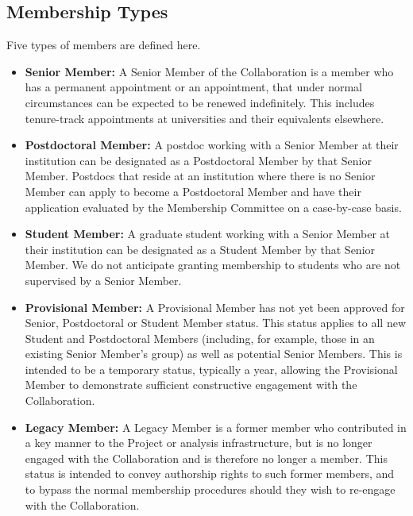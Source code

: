 \documentclass[12pt]{article}
\begin{document}
\subsection{Membership Types}
\label{sec:memtypes}
Five types of members are defined here.  
\begin{itemize}

\item {\bf Senior Member:} A Senior Member of the Collaboration is a member who has a permanent appointment or an appointment, that under normal circumstances can be expected to be renewed indefinitely.   This includes tenure-track appointments at universities and their equivalents elsewhere.  

\item {\bf Postdoctoral Member:} A postdoc working with a Senior Member at their institution can be designated as a Postdoctoral Member by that Senior Member.  Postdocs that reside at an institution where there is no Senior Member can apply to become a Postdoctoral Member and have their application evaluated by the Membership Committee on a case-by-case basis. 

\item {\bf Student Member:} A graduate student working with a Senior Member at their institution can be designated as a Student Member by that Senior Member.  We do not anticipate granting membership to students who are not supervised by a Senior Member.


\item\textcolor{\markcolor}{ {\bf Provisional Member:}  A Provisional Member has not yet been approved for
Senior, Postdoctoral or Student Member status.  This status applies to all new Student and Postdoctoral Members
(including, for example, those in an existing Senior Member's group) as well as potential Senior Members.  This is intended to be a temporary status, typically a year, allowing the Provisional Member to demonstrate
sufficient constructive engagement with the Collaboration.
}


\item {\bf Legacy Member:}  A Legacy Member is a former member who contributed in a key manner to the Project or analysis infrastructure, but is no longer engaged with the Collaboration and is therefore no longer a member.  This status is intended to convey authorship rights to such former members, and to bypass the normal membership procedures should they wish to re-engage with the Collaboration.


\end{itemize}
\end{document}
